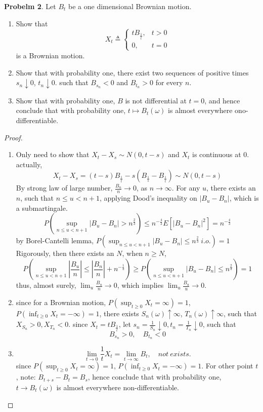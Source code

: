\documentclass{article}     %
\begin{document}
\noindent
\textbf{Probelm 2}. Let $B_t$ be a one dimensional Brownian motion.
\begin{enumerate}[(1)]
    \item Show that 
    \[X_t \triangleq \begin{cases}
        tB_{\frac{1}{t}}, & t>0\\ 
        0, & t=0
        \end{cases}\]
is a Brownian motion.
    \item Show that with probability one, there exist two sequences of positive times $s_n\downarrow 0$, $t_n\downarrow 0$. such that $B_{s_n}<0$ and $B_{t_n}>0$ for every $n$.
    \item Show that with probability one, $B$ is not differential at $t=0$, and hence conclude that with probability one, $t\mapsto B_t(\omega)$ is almost everywhere ono-differentiable.
\end{enumerate}
\begin{proof}
\begin{enumerate}[(1)]
    \item Only need to show that $X_t-X_s\sim N(0,t-s)$ and $X_t$ is continuous at $0$.
    actually,
   \[X_t-X_s = (t-s)B_{\frac{1}{t}}-s(B_{\frac{1}{s}}-B_{\frac{1}{t}})\sim N(0,t-s)\]
   By strong law of large number, $\frac{B_n}{n}\rightarrow 0$, as $n\rightarrow \infty$. For any $u$, there exists an $n$, such that $n\leq u < n+1$, applying Dood's inequality on $|B_u-B_n|$, which is a submartingale.
   \[P(\sup_{n\leq u<n+1}|B_u-B_n|>n^{\frac{2}{3}})\leq n^{-\frac{4}{3}}E[|B_u-B_n|^2]=n^{-\frac{4}{3}}\]
  by Borel-Cantelli lemma, $P(\sup_{n\leq u<n+1}|B_u-B_n|
  \leq n^{\frac{2}{3}}~ i.o.)=1$
  Rigorously, then there exists an $N$, when $n\geq N$, 
  \[P(\sup_{n\leq u<n+1}|\frac{B_u}{n}|\leq |\frac{B_n}{n}|+n^{-\frac{1}{3}})\geq P(\sup_{n\leq u<n+1}|B_u-B_n|\leq n^{\frac{2}{3}})=1\]
  thus, almost surely, $\lim_u \frac{B_u}{n}\rightarrow 0$, which implies $\lim_u \frac{B_u}{u}\rightarrow 0$.
 
   \item since for a Brownian motion, $P(\sup_{t\geq 0}X_t=\infty)=1$, $P(\inf_{t\geq 0}X_t=-\infty)=1$, there exists $S_n(\omega)\uparrow \infty$, $T_n(\omega)\uparrow \infty$, such that $X_{S_n}>0, X_{T_n}<0$. since $X_t=tB_{\frac{1}{t}}$, let $s_n=\frac{1}{S_n}\downarrow 0, t_n=\frac{1}{T_n}\downarrow 0$, such that 
   \[B_{s_n}>0,\quad B_{t_n}<0\]
   \item \[\lim_{t\rightarrow 0}\frac{1}{t}X_t=\lim_{t\rightarrow \infty}B_{t},\quad not~exists.\]
   since  $P(\sup_{t\geq 0}X_t=\infty)=1$, $P(\inf_{t\geq 0}X_t=-\infty)=1$. For other point $t$, note: $B_{t+s}-B_t=B_s$, hence conclude that with probability one, $t\rightarrow B_t(\omega)$ is almost everywhere non-differentiable.
\end{enumerate}
\end{proof}
\end{document}
